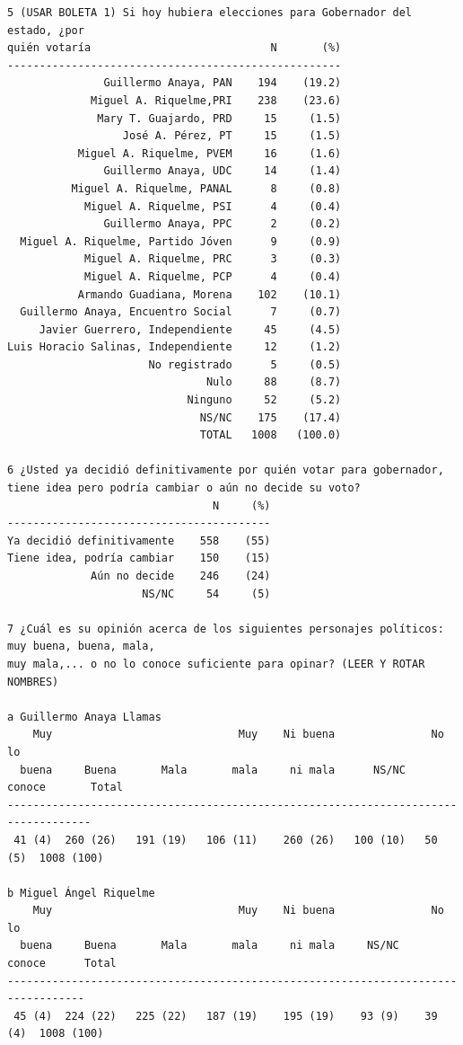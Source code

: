 \documentclass[letter,12pt]{article}
\begin{document}
\begin{scriptsize}
\begin{verbatim}
5 (USAR BOLETA 1) Si hoy hubiera elecciones para Gobernador del estado, ¿por 
quién votaría                            N       (%)
----------------------------------------------------
               Guillermo Anaya, PAN    194    (19.2) 
             Miguel A. Riquelme,PRI    238    (23.6) 
              Mary T. Guajardo, PRD     15     (1.5) 
                  José A. Pérez, PT     15     (1.5) 
           Miguel A. Riquelme, PVEM     16     (1.6) 
               Guillermo Anaya, UDC     14     (1.4) 
          Miguel A. Riquelme, PANAL      8     (0.8) 
            Miguel A. Riquelme, PSI      4     (0.4) 
               Guillermo Anaya, PPC      2     (0.2) 
  Miguel A. Riquelme, Partido Jóven      9     (0.9) 
            Miguel A. Riquelme, PRC      3     (0.3) 
            Miguel A. Riquelme, PCP      4     (0.4) 
           Armando Guadiana, Morena    102    (10.1) 
  Guillermo Anaya, Encuentro Social      7     (0.7) 
     Javier Guerrero, Independiente     45     (4.5) 
Luis Horacio Salinas, Independiente     12     (1.2) 
                      No registrado      5     (0.5) 
                               Nulo     88     (8.7) 
                            Ninguno     52     (5.2) 
                              NS/NC    175    (17.4) 
                              TOTAL   1008   (100.0)

6 ¿Usted ya decidió definitivamente por quién votar para gobernador, 
tiene idea pero podría cambiar o aún no decide su voto?
                                N     (%)
-----------------------------------------
Ya decidió definitivamente    558    (55)
Tiene idea, podría cambiar    150    (15)
             Aún no decide    246    (24)
                     NS/NC     54     (5) 

7 ¿Cuál es su opinión acerca de los siguientes personajes políticos: muy buena, buena, mala, 
muy mala,... o no lo conoce suficiente para opinar? (LEER Y ROTAR NOMBRES)

a Guillermo Anaya Llamas       
    Muy                             Muy    Ni buena               No lo  
  buena     Buena       Mala       mala     ni mala      NS/NC   conoce       Total
-----------------------------------------------------------------------------------
 41 (4)  260 (26)   191 (19)   106 (11)    260 (26)   100 (10)   50 (5)  1008 (100)  
 
b Miguel Ángel Riquelme        
    Muy                             Muy    Ni buena               No lo  
  buena     Buena       Mala       mala     ni mala     NS/NC    conoce      Total
----------------------------------------------------------------------------------
 45 (4)  224 (22)   225 (22)   187 (19)    195 (19)    93 (9)    39 (4)  1008 (100) 


\end{verbatim}
\end{scriptsize}
\end{document}
